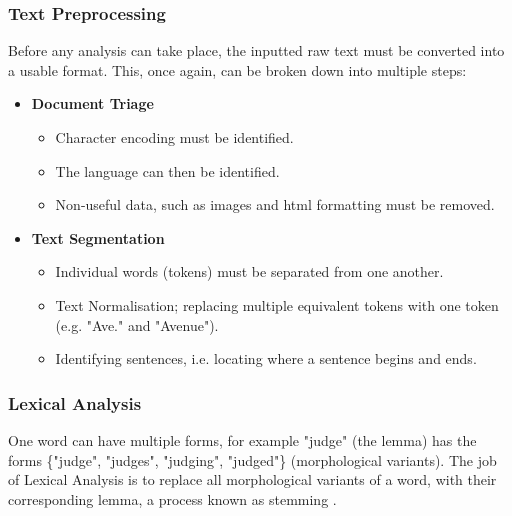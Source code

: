 \documentclass[]{article}
\begin{document}
\subsubsection{Text Preprocessing}
\label{sec:TextPreprocessing}
Before any analysis can take place, the inputted raw text must be converted into a usable format. This, once again, can be broken down into multiple steps\cite{NLPHandbook}:
\begin{itemize}
	\item \textbf{Document Triage}

	\begin{itemize}
		\item Character encoding must be identified.
		\item The language can then be identified. %
		\item Non-useful data, such as images and html formatting must be removed.			\end{itemize}	
	\item \textbf{Text Segmentation}
	
	\begin{itemize}
		\item Individual words (tokens) must be separated from one another. %
		\item Text Normalisation; replacing multiple equivalent tokens with one token (e.g. "Ave." and "Avenue").
		\item Identifying sentences, i.e. locating where a sentence begins and ends. 
	\end{itemize}
	
\end{itemize} 


\subsubsection{Lexical Analysis}
\label{sec:LexicalAnalysis}
One word can have multiple forms, for example "judge" (the lemma) has the forms \{"judge", "judges", "judging", "judged"\} (morphological variants).  The job of Lexical Analysis is to replace all morphological variants of a word, with their corresponding lemma, a process known as stemming \cite{NLPHandbook}.
\end{document}
